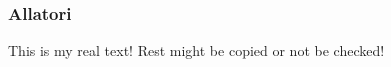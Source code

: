 \subsubsection{Allatori} \label{subsubsection:evaluation-reengineering-optobf-allatori}
This is my real text! Rest might be copied or not be checked!
